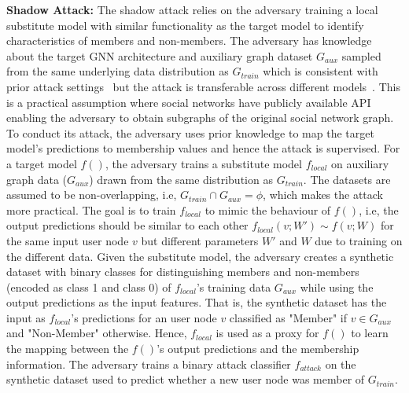\noindent\textbf{Shadow Attack:} The shadow attack relies on the adversary training a local substitute model with similar functionality as the target model to identify characteristics of members and non-members.
The adversary has knowledge about the target GNN architecture and auxiliary graph dataset $G_{aux}$ sampled from the same underlying data distribution as $G_{train}$ which is consistent with prior attack settings~\cite{membershipinf,attributeinf,attributeinf2,logan} but the attack is transferable across different models~\cite{ndss19salem}.
This is a practical assumption where social networks have publicly available API enabling the adversary to obtain subgraphs of the original social network graph.
To conduct its attack, the adversary uses prior knowledge to map the target model's predictions to membership values and hence the attack is supervised.
For a target model $f()$, the adversary trains a substitute model $f_{local}$ on auxiliary graph data ($G_{aux}$) drawn from the same distribution as $G_{train}$.
The datasets are assumed to be non-overlapping, i.e, $G_{train} \cap G_{aux} = \phi$, which makes the attack more practical.
The goal is to train $f_{local}$ to mimic the behaviour of $f()$, i.e, the output predictions should be similar to each other $f_{local}(v;W') \sim f(v;W)$ for the same input user node $v$ but different parameters $W'$ and $W$ due to training on the different data.
Given the substitute model, the adversary creates a synthetic dataset with binary classes for distinguishing members and non-members (encoded as class 1 and class 0) of $f_{local}$'s training data $G_{aux}$ while using the output predictions as the input features.
That is, the synthetic dataset has the input as $f_{local}$'s predictions for an user node $v$ classified as "Member" if $v \in G_{aux}$ and "Non-Member" otherwise.
Hence, $f_{local}$ is used as a proxy for $f()$ to learn the mapping between the $f()$'s output predictions and the membership information.
The adversary trains a binary attack classifier $f_{attack}$ on the synthetic dataset used to predict whether a new user node was member of $G_{train}$.\\






